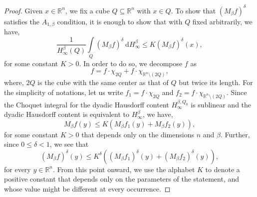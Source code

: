 \documentclass[10pt,a4paper]{amsart}
\begin{document}
		\begin{proof}
			Given $x \in \mathbb{R}^n$, we fix a cube $Q \subseteq \mathbb{R}^n$ with $x \in Q$. To show that $\left( M_{\beta}f \right)^{\delta}$ satisfies the $A_{1, \beta}$ condition, it is enough to show that with $Q$ fixed arbitrarily, we have,
			\begin{equation}
				\label{GoalEquation}
				\frac{1}{H^{\beta}_{\infty} \left( Q \right)} \int\limits_{Q} \left( M_{\beta}f \right)^{\delta} \ \mathrm{d}H^{\beta}_{\infty} \leq K \left( M_{\beta}f \right)^{\delta} \left( x \right),
			\end{equation}
			for some constant $K > 0$. In order to do so, we decompose $f$ as
			$$f = f \cdot \chi_{2Q} + f \cdot \chi_{\mathbb{R}^n \setminus \left( 2Q \right)},$$
			where, $2Q$ is the cube with the same center as that of $Q$ but twice its length. For the simplicity of notations, let us write $f_1 = f \cdot \chi_{2Q}$ and $f_2 = f \cdot \chi_{\mathbb{R}^n \setminus \left( 2Q \right)}$. Since the Choquet integral for the dyadic Hausdorff content $H^{\beta, Q_0}_{\infty}$ is sublinear and the dyadic Hausdorff content is equivalent to $H^{\beta}_{\infty}$, we have,
			$$M_{\beta}f \left( y \right) \leq K \left( M_{\beta}f_1 \left( y \right) + M_{\beta}f_2 \left( y \right) \right),$$
			for some constant $K > 0$ that depends only on the dimensions $n$ and $\beta$. Further, since $0 \leq \delta < 1$, we see that
			$$\left( M_{\beta}f \right)^{\delta} \left( y \right) \leq K^{\delta} \left( \left( M_{\beta}f_1 \right)^{\delta} \left( y \right) + \left( M_{\beta}f_2 \right)^{\delta} \left( y \right) \right),$$
			for every $y \in \mathbb{R}^n$. From this point onward, we use the alphabet $K$ to denote a positive constant that depends only on the parameters of the statement, and whose value might be different at every occurrence.
			

\end{proof}
\end{document}
